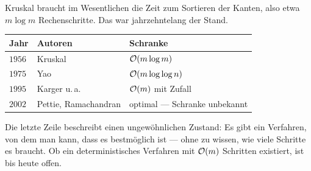 \begin{forschung}
Kruskal braucht im Wesentlichen die Zeit zum Sortieren der Kanten, also etwa $m \log m$ Rechenschritte. Das war jahrzehntelang der Stand.

\begin{center}
{\small
\renewcommand{\arraystretch}{1.42}
\begin{tabular}{@{}P{1.6cm}P{2.4cm}P{4.0cm}@{}}
\toprule
\textbf{Jahr} & \textbf{Autoren} & \textbf{Schranke}\\
\midrule
$1956$ & Kruskal & $\mathcal{O}(m \log m)$\\
$1975$ & Yao & $\mathcal{O}(m \log\log n)$\\
$1995$ & Karger u.\,a. & $\mathcal{O}(m)$ mit Zufall\\
$2002$ & Pettie, Ramachandran & optimal --- Schranke unbekannt\\
\bottomrule
\end{tabular}}
\end{center}

Die letzte Zeile beschreibt einen ungewöhnlichen Zustand: Es gibt ein Verfahren, von dem man  kann, dass es bestmöglich ist --- ohne zu wissen, wie viele Schritte es braucht. Ob ein deterministisches Verfahren mit $\mathcal{O}(m)$ Schritten existiert, ist bis heute offen.

\begin{center}
\begin{minipage}{0.9\textwidth}
\end{minipage}
\end{center}
\end{forschung}

